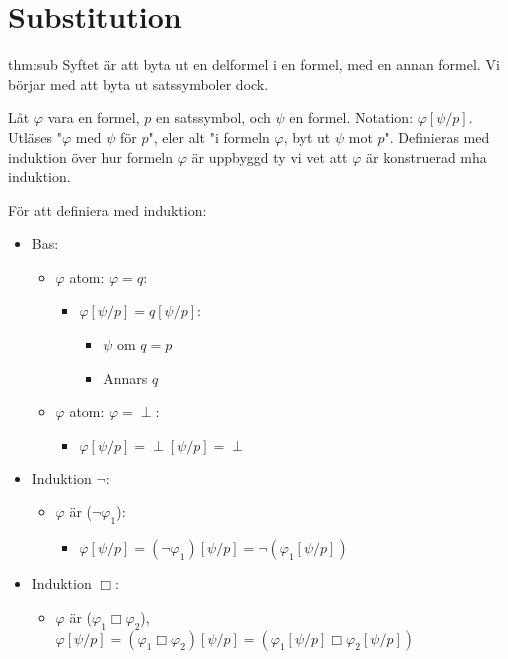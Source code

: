 \section{Substitution}

\begin{theo}[Substitution]{thm:sub}
  Syftet är att byta ut en delformel i en formel, med en annan formel. Vi börjar med att byta ut satssymboler dock.
  \par\bigskip
  \noindent Låt $\varphi$ vara en formel, $p$ en satssymbol, och $\psi$ en formel. Notation: $\varphi\left[\psi/p\right]$. Utläses "$\varphi$ med $\psi$ för $p$", eler alt "i formeln $\varphi$, byt ut $\psi$ mot $p$". Definieras med induktion över hur formeln $\varphi$ är uppbyggd ty vi vet att $\varphi$ är konstruerad mha induktion.
\end{theo}
\par\bigskip
\noindent För att definiera med induktion:

\begin{itemize}
  \item Bas:
    \begin{itemize}
      \item $\varphi$ atom: $\varphi = q$:
        \begin{itemize}
          \item $\varphi[\psi/p]=q[\psi/p]$:
            \begin{itemize}
              \item $\psi$ om $q=p$
              \item Annars $q$
            \end{itemize}
        \end{itemize}
      \item $\varphi$ atom: $\varphi = \perp$:
        \begin{itemize}
          \item $\varphi[\psi/p] = \perp[\psi/p]=\perp$
        \end{itemize}
    \end{itemize}
  \item Induktion $\neg$:
    \begin{itemize}
      \item $\varphi$ är ($\neg\varphi_1$):
        \begin{itemize}
          \item $\varphi[\psi/p] = (\neg\varphi_1)[\psi/p]=\neg(\varphi_1[\psi/p])$
        \end{itemize}
    \end{itemize}
  \item Induktion $\Box$:
    \begin{itemize}
      \item $\varphi$ är ($\varphi_1\Box\varphi_2$), $\varphi[\psi/p]=(\varphi_1\Box\varphi_2)[\psi/p]=(\varphi_1[\psi/p]\Box\varphi_2[\psi/p])$
    \end{itemize}
\end{itemize}
\par\bigskip

